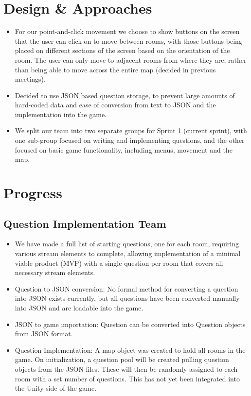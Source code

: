 \documentclass{article}
\begin{document}
\section{Design \& Approaches}
\begin{itemize}
    \item For our point-and-click movement we choose to show buttons on the screen that the user can click on to move between rooms, with those buttons being placed on different sections of the screen based on the orientation of the room. The user can only move to adjacent rooms from where they are, rather than being able to move across the entire map (decided in previous meetings).
    \item Decided to use JSON based question storage, to prevent large amounts of hard-coded data and ease of conversion from text to JSON and the implementation into the game.
    \item We split our team into two separate groups for Sprint 1 (current sprint), with one sub-group focused on writing and implementing questions, and the other focused on basic game functionality, including menus, movement and the map.
\end{itemize}


\section{Progress}
\subsection*{Question Implementation Team}
\begin{itemize}
    \item We have made a full list of starting questions, one for each room, requiring various stream elements to complete, allowing implementation of a minimal viable product (MVP) with a single question per room that covers all necessary stream elements.
    \item Question to JSON conversion: No formal method for converting a question into JSON exists currently, but all questions have been converted manually into JSON and are loadable into the game.
    \item JSON to game importation: Question can be converted into Question objects from JSON format.
    \item Question Implementation: A map object was created to hold all rooms in the game. On initialization, a question pool will be created pulling question objects from the JSON files. These will then be randomly assigned to each room with a set number of questions. This has not yet been integrated into the Unity side of the game.
\end{itemize}
\end{document}
